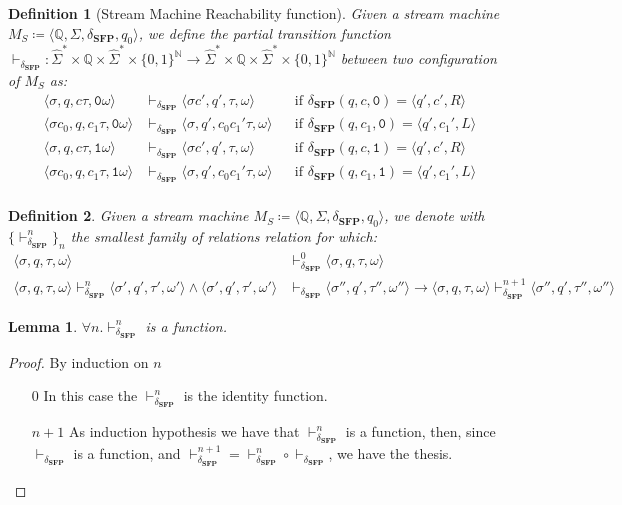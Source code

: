 \documentclass[10pt]{amsart}
\newcommand{\SFP}{\mathbf{SFP}}
\newcommand{\zero}{\mathtt{0}}
\newcommand{\one}{\mathtt{1}}
\newcommand{\NN}{\mathbb{N}}
\newcommand{\QQ}{\mathbb{Q}}
\newcommand{\ms}{q}
\newcommand{\msf}{q'}
\newcommand{\msi}[1]{q_{#1}}
\newcommand{\mc}{c}
\newcommand{\mcf}{c'}
\newcommand{\mci}[1]{c_{#1}}
\newcommand{\Sigmab}{\hat{\Sigma}}
\newcommand{\mcan}{M_{S}}
\newcommand{\genm}{\mcan\coloneqq \langle \QQ, \Sigma, \TT, \msi0 \rangle}
\newcommand{\sone}{\sigma}
\newcommand{\stwo}{\tau}
\newcommand{\oone}{\omega}
\newcommand{\mcnf}{\langle \sone, \ms, \stwo, \oone \rangle}
\newcommand{\mcnff}{\langle \sone', \msf, \stwo', \oone' \rangle}
\newcommand{\mcnfff}{\langle \sone'', \msf, \stwo'', \oone'' \rangle}
\newcommand{\rcs}[1]{\vdash_{#1}}
\newcommand{\Rcs}[2]{\vdash_{#1}^{#2}}
\newcommand{\TT}{\delta_\SFP}
\newtheorem{defn}{Definition}
\newtheorem{lemma}{Lemma}
\begin{document}
\begin{defn}[Stream Machine Reachability function]
Given a stream machine $\genm$, we define the partial transition function $\rcs\TT: \Sigmab^* \times \QQ \times \Sigmab^* \times \{0,1\}^\NN\longrightarrow \Sigmab^* \times \QQ \times \Sigmab^* \times \{0,1\}^\NN$ between two configuration of $\mcan$ as:
\begin{align*}
\langle \sone, \ms, \mc \stwo, \zero\oone\rangle &\rcs\TT \langle \sone\mcf, \msf, \stwo, \oone\rangle && \text{if }\TT(\ms, \mc, \zero) =  \langle \msf, \mcf, R \rangle\\
\langle \sone \mci 0, \ms,\mci 1 \stwo, \zero\oone\rangle &\rcs\TT \langle \sone, \msf,\mci0\mci1' \stwo, \oone\rangle && \text{if }\TT( \ms, \mci 1, \zero) =\langle \msf, \mci 1', L \rangle\\
\langle \sone, \ms, \mc \stwo, \one\oone\rangle &\rcs\TT \langle \sone\mcf, \msf, \stwo, \oone\rangle&& \text{if }  \TT(\ms, \mc, \one) = \langle \msf, \mcf, R\rangle \\
\langle \sone \mci 0, \ms,\mci 1 \stwo, \one\oone\rangle &\rcs\TT \langle \sone, \msf,\mci0\mci1' \stwo, \oone\rangle && \text{if }\TT(\ms, \mci 1, \one)=\langle \msf, \mci 1', L \rangle  \\
\end{align*}
\end{defn}


\begin{defn}
Given a stream machine $\genm$, we denote with $\{\Rcs\TT n\}_n$ the smallest family of relations relation for which:
\begin{align*}
\mcnf&\Rcs\TT 0 \mcnf\\
\mcnf\Rcs\TT {n} \mcnff \land \mcnff &\rcs\TT \mcnfff \to \mcnf\Rcs\TT {n+1} \mcnfff
\end{align*}
\end{defn}

\begin{lemma}
$\forall n. \Rcs\TT n$ is a function.
\end{lemma}

\begin{proof}
By induction on $n$
\begin{itemize}
\item[0] In this case the $\Rcs\TT n$ is the identity function.
\item[$n+1$] As induction hypothesis we have that $\Rcs\TT n$ is a function, then, since $\rcs\TT$ is a function, and $\Rcs\TT {n+1} = \Rcs\TT n\circ \rcs \TT $, we have the thesis.
\end{itemize}
\end{proof}
\end{document}
